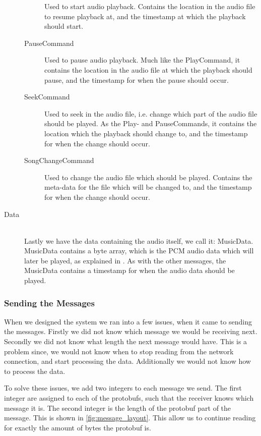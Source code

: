 \begin{description}
\begin{description}
                Used to start audio playback.
                Contains the location in the audio file to resume playback at, and the timestamp at which the playback should start.
            \item[PauseCommand]
                Used to pause audio playback.
                Much like the PlayCommand, it contains the location in the audio file at which the playback should pause, and the timestamp for when the pause should occur.
            \item[SeekCommand]
                Used to seek in the audio file, i.e. change which part of the audio file should be played.
                As the Play- and PauseCommands, it contains the location which the playback should change to, and the timestamp for when the change should occur.
            \item[SongChangeCommand]
                Used to change the audio file which should be played.
                Contains the meta-data for the file which will be changed to, and the timestamp for when the change should occur.
        \end{description}

    \item[Data] \hfill \\
        Lastly we have the data containing the audio itself, we call it: MusicData.
        MusicData contains a byte array, which is the \ac{PCM} audio data which will later be played, as explained in .
        As with the other messages, the MusicData contains a timestamp for when the audio data should be played.
\end{description}

\subsubsection{Sending the Messages}
When we designed the system we ran into a few issues, when it came to sending the messages.
Firstly we did not know which message we would be receiving next.
Secondly we did not know what length the next message would have.
This is a problem since, we would not know when to stop reading from the network connection, and start processing the data.
Additionally we would not know how to process the data.

To solve these issues, we add two integers to each message we send.
The first integer are assigned to each of the protobufs, such that the receiver knows which message it is.
The second integer is the length of the protobuf part of the message.
This is shown in \cref{fig:message_layout}.
This allow us to continue reading for exactly the amount of bytes the protobuf is.

